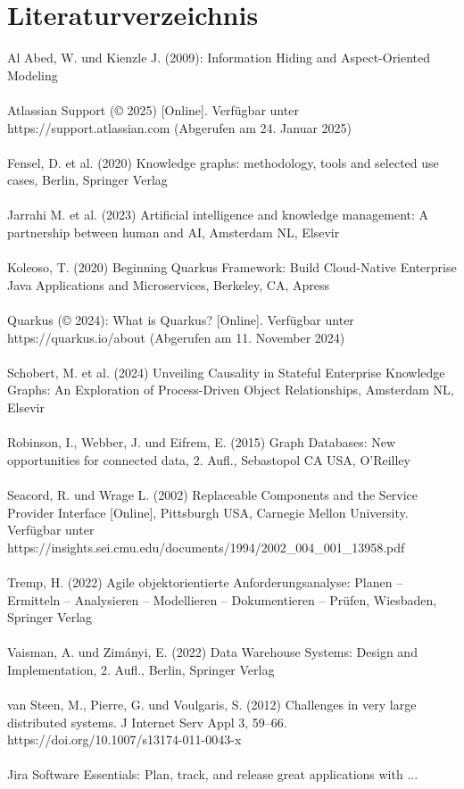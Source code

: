 \section{Literaturverzeichnis}
Al Abed, W. und Kienzle J. (2009): Information Hiding and Aspect-Oriented Modeling\\\\
Atlassian Support (© 2025) [Online]. Verfügbar unter https://support.atlassian.com (Abgerufen am 24. Januar 2025)\\\\
Fensel, D. et al. (2020) Knowledge graphs: methodology, tools and selected use cases, Berlin, Springer Verlag\\\\
Jarrahi M. et al. (2023) Artificial intelligence and knowledge management: A partnership between human and AI, Amsterdam NL, Elsevir \\\\
Koleoso, T. (2020) Beginning Quarkus Framework: Build Cloud-Native Enterprise Java Applications and Microservices, Berkeley, CA, Apress\\\\
Quarkus (© 2024): What is Quarkus? [Online]. Verfügbar unter https://quarkus.io/about (Abgerufen am 11. November 2024)\\\\
Schobert, M. et al. (2024) Unveiling Causality in Stateful Enterprise Knowledge Graphs: An Exploration of Process-Driven Object Relationships, Amsterdam NL, Elsevir\\\\
Robinson, I., Webber, J. und Eifrem, E. (2015) Graph Databases: New opportunities for connected data, 2. Aufl., Sebastopol CA USA, O'Reilley\\\\
Seacord, R. und Wrage L. (2002) Replaceable Components and the Service Provider Interface [Online], Pittsburgh USA, Carnegie Mellon University. Verfügbar unter https://insights.sei.cmu.edu/documents/1994/2002\_004\_001\_13958.pdf\\\\
Tremp, H. (2022)  Agile objektorientierte Anforderungsanalyse:  Planen – Ermitteln – Analysieren – Modellieren – Dokumentieren – Prüfen, Wiesbaden, Springer Verlag\\\\
Vaisman, A. und Zimányi, E. (2022) Data Warehouse Systems: Design and Implementation, 2. Aufl., Berlin, Springer Verlag\\\\
van Steen, M., Pierre, G. und Voulgaris, S. (2012) Challenges in very large distributed systems. J Internet Serv Appl 3, 59–66. https://doi.org/10.1007/s13174-011-0043-x\\\\
Jira Software Essentials: Plan, track, and release great applications with ...